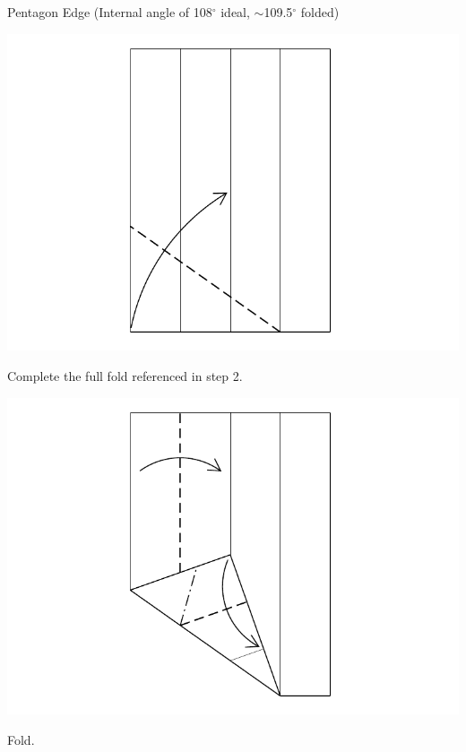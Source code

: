 \documentclass[11pt]{article}
\begin{document}
\newpage
{\Large Pentagon Edge}  (Internal angle of 108$^\circ$ ideal, $\sim$109.5$^\circ$ folded)
\vspace*{0.25in}

\begin{minipage}[t]{0.3\textwidth}
  \includegraphics[width=\textwidth]{../figs/fig05-04}
  \begin{itemize}{\item[4.] Complete the full fold referenced in step 2.}\end{itemize}
\end{minipage}
\begin{minipage}[t]{0.3\textwidth}
  \includegraphics[width=\textwidth]{../figs/fig05-05}
  \begin{itemize}{\item[5.] Fold.}\end{itemize}
\end{minipage}
\end{document}

